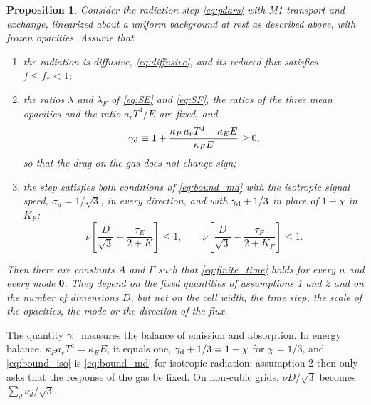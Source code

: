 \documentclass[preprint,12pt,authoryear]{elsarticle}
\newtheorem{prop}{Proposition}
\begin{document}
\begin{appendix}
\begin{prop}
\label{prop:m1}
Consider the radiation step \autoref{eq:pdars} with M1 transport and exchange, linearized about a uniform background at rest as described above, with frozen opacities. Assume that
\begin{enumerate}
    \item the radiation is diffusive, \autoref{eq:diffusive}, and its reduced flux satisfies $f \leq f_* < 1$;
    \item the ratios $\lambda$ and $\lambda_F$ of \autoref{eq:SE} and \autoref{eq:SF}, the ratios of the three mean opacities and the ratio $a_r T^4/E$ are fixed, and
    \begin{equation}
        \gamma_{\rm d} \equiv 1 + \frac{\kappa_P\,a_r T^4 - \kappa_E E}{\kappa_F E} \geq 0 ,
        \label{eq:gamma_drag}
    \end{equation}
    so that the drag on the gas does not change sign;
    \item the step satisfies both conditions of \autoref{eq:bound_md} with the isotropic signal speed, $\sigma_d = 1/\sqrt{3}$, in every direction, and with $\gamma_{\rm d} + 1/3$ in place of $1 + \chi$ in $K_F$:
    \begin{equation}
        \nu\left[\frac{D}{\sqrt{3}} - \frac{\tau_E}{2 + K}\right] \leq 1,
        \qquad
        \nu\left[\frac{D}{\sqrt{3}} - \frac{\tau_F}{2 + K_F}\right] \leq 1 .
        \label{eq:bound_iso}
    \end{equation}
\end{enumerate}
Then there are constants $A$ and $\Gamma$ such that \autoref{eq:finite_time} holds for every $n$ and every mode $\boldsymbol{\theta}$. They depend on the fixed quantities of assumptions 1 and 2 and on the number of dimensions $D$, but not on the cell width, the time step, the scale of the opacities, the mode or the direction of the flux.
\end{prop}

The quantity $\gamma_{\rm d}$ measures the balance of emission and absorption. In energy balance, $\kappa_P a_r T^4 = \kappa_E E$, it equals one, $\gamma_{\rm d} + 1/3 = 1 + \chi$ for $\chi = 1/3$, and \autoref{eq:bound_iso} is \autoref{eq:bound_md} for isotropic radiation; assumption 2 then only asks that the response of the gas be fixed. On non-cubic grids, $\nu D/\sqrt{3}$ becomes $\sum_d\nu_d/\sqrt{3}$.


\end{appendix}
\end{document}
